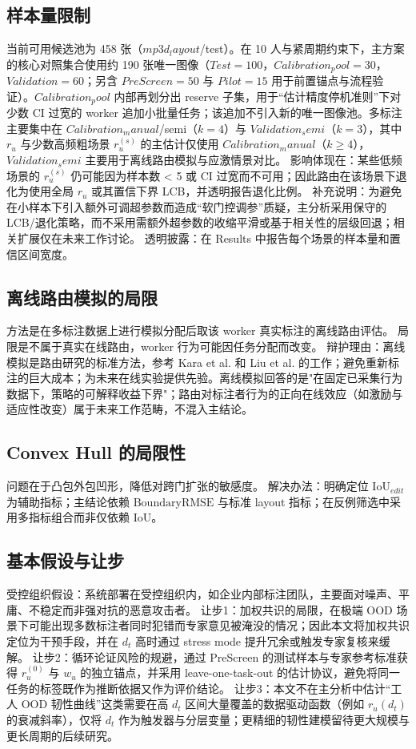 \documentclass[journal,onecolumn]{IEEEtran}
\begin{document}
\subsection{样本量限制}
当前可用候选池为 458 张（$mp3d_layout$/test）。在 10 人与紧周期约束下，主方案的核心对照集合使用约 190 张唯一图像（$Test=100$，$Calibration_pool=30$，$Validation=60$；另含 $PreScreen=50$ 与 $Pilot=15$ 用于前置锚点与流程验证）。$Calibration_pool$ 内部再划分出 reserve 子集，用于“估计精度停机准则”下对少数 CI 过宽的 worker 追加小批量任务；该追加不引入新的唯一图像池。多标注主要集中在 $Calibration_manual$/semi（$k=4$）与 $Validation_semi$（$k=3$），其中 $r_{u}$ 与少数高频粗场景 $r_{u}^{(s)}$ 的主估计仅使用 $Calibration_manual$（$k\geq4$），$Validation_semi$ 主要用于离线路由模拟与应激情景对比。
影响体现在：某些低频场景的 $r_{u}^{(s)}$ 仍可能因为样本数 < 5 或 CI 过宽而不可用；因此路由在该场景下退化为使用全局 $r_{u}$ 或其置信下界 LCB，并透明报告退化比例。
补充说明：为避免在小样本下引入额外可调超参数而造成“软门控调参”质疑，主分析采用保守的 LCB/退化策略，而不采用需额外超参数的收缩平滑或基于相关性的层级回退；相关扩展仅在未来工作讨论。
透明披露：在 Results 中报告每个场景的样本量和置信区间宽度。
\subsection{离线路由模拟的局限}
方法是在多标注数据上进行模拟分配后取该 worker 真实标注的离线路由评估。
局限是不属于真实在线路由，worker 行为可能因任务分配而改变。
辩护理由：离线模拟是路由研究的标准方法，参考 Kara et al. 和 Liu et al. 的工作；避免重新标注的巨大成本；为未来在线实验提供先验。离线模拟回答的是"在固定已采集行为数据下，策略的可解释收益下界"；路由对标注者行为的正向在线效应（如激励与适应性改变）属于未来工作范畴，不混入主结论。
\subsection{Convex Hull 的局限性}
问题在于凸包外包凹形，降低对跨门扩张的敏感度。
解决办法：明确定位 $\mathrm{IoU}_{edit}$ 为辅助指标；主结论依赖 $\mathrm{BoundaryRMSE}$ 与标准 layout 指标；在反例筛选中采用多指标组合而非仅依赖 IoU。

\subsection{基本假设与让步}
受控组织假设：系统部署在受控组织内，如企业内部标注团队，主要面对噪声、平庸、不稳定而非强对抗的恶意攻击者。
让步1：加权共识的局限，在极端 OOD 场景下可能出现多数标注者同时犯错而专家意见被淹没的情况；因此本文将加权共识定位为干预手段，并在 $d_{t}$ 高时通过 stress mode 提升冗余或触发专家复核来缓解。
让步2：循环论证风险的规避，通过 PreScreen 的测试样本与专家参考标准获得 $r_{u}^{(0)}$ 与 $w_{u}$ 的独立锚点，并采用 leave-one-task-out 的估计协议，避免将同一任务的标签既作为推断依据又作为评价结论。
让步3：本文不在主分析中估计“工人 OOD 韧性曲线”这类需要在高 $d_{t}$ 区间大量覆盖的数据驱动函数（例如 $r_{u}(d_{t})$ 的衰减斜率），仅将 $d_{t}$ 作为触发器与分层变量；更精细的韧性建模留待更大规模与更长周期的后续研究。
\end{document}

